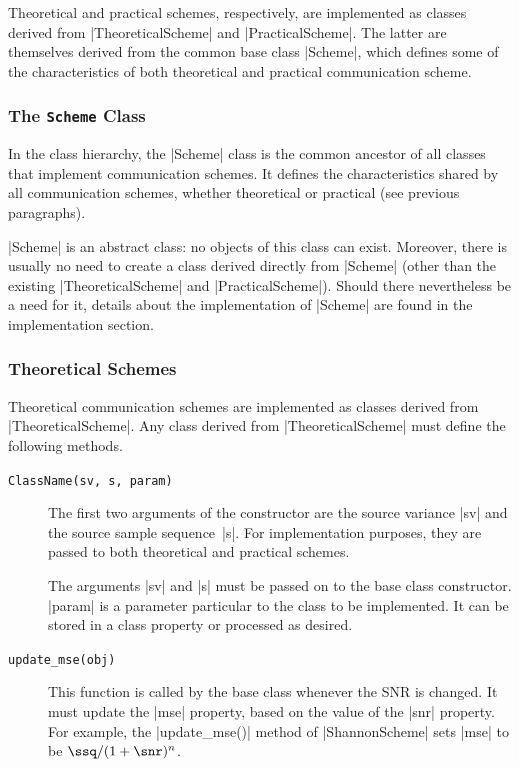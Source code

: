 Theoretical and practical schemes, respectively, are implemented as classes
derived from |TheoreticalScheme| and |PracticalScheme|. The latter are
themselves derived from the common base class |Scheme|, which defines some of
the characteristics of both theoretical and practical communication scheme. 


\subsubsection{The \texttt{Scheme} Class}

In the class hierarchy, the |Scheme| class is the common ancestor of all classes
that implement communication schemes. It defines the characteristics shared by
all communication schemes, whether theoretical or practical (see previous
paragraphs). 

|Scheme| is an abstract class: no objects of this class can exist. Moreover,
there is usually no need to create a class derived directly from |Scheme| (other
than the existing |TheoreticalScheme| and |PracticalScheme|). Should there
nevertheless be a need for it, details about the implementation of |Scheme| are
found in the implementation section. 


\subsubsection{Theoretical Schemes}

Theoretical communication schemes are implemented as classes derived from
|TheoreticalScheme|. Any class derived from |TheoreticalScheme| must define the
following methods.

\begin{description}
  \item[\texttt{ClassName(sv, s, param)}] The first two arguments of the
    constructor are the source variance |sv| and the source sample sequence~|s|.
    For implementation purposes, they are passed to both theoretical and
    practical schemes. 

    The arguments |sv| and |s| must be passed on to the base class constructor.
    |param| is a parameter particular to the class to be implemented. It can be
    stored in a class property or processed as desired.

  \item[\texttt{update\_mse(obj)}] This function is called by the base class
    whenever the SNR is changed. It must update the |mse| property, based on the
    value of the |snr| property. For example, the |update_mse()| method of
    |ShannonScheme| sets |mse| to be $\ssq / (1 + \snr)^n$.
\end{description}


